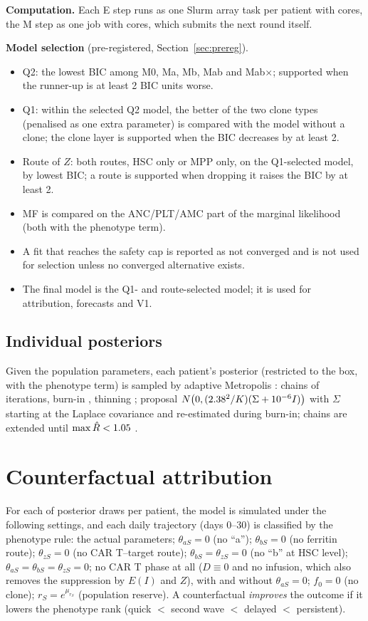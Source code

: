 \documentclass[11pt]{article}
\begin{document}
\textbf{Computation.} Each E step runs as one Slurm array task per patient with \valEcores{} cores, the M step as one job with \valMcores{} cores, which submits the next round itself.



\textbf{Model selection} (pre-registered, Section~\ref{sec:prereg}).
\begin{itemize}
\item Q2: the lowest BIC among M0, Ma, Mb, Mab and Mab$\times$; supported when the runner-up is at least 2 BIC units worse.
\item Q1: within the selected Q2 model, the better of the two clone types (penalised as one extra parameter) is compared with the model without a clone; the clone layer is supported when the BIC decreases by at least 2.
\item Route of $Z$: both routes, HSC only or MPP only, on the Q1-selected model, by lowest BIC; a route is supported when dropping it raises the BIC by at least 2.
\item MF is compared on the ANC/PLT/AMC part of the marginal likelihood (both with the phenotype term).
\item A fit that reaches the safety cap is reported as not converged and is not used for selection unless no converged alternative exists.
\item The final model is the Q1- and route-selected model; it is used for attribution, forecasts and V1.
\end{itemize}

\subsection{Individual posteriors}
Given the population parameters, each patient's posterior (restricted to the box, with the phenotype term) is sampled by adaptive Metropolis \citep{haario2001}: \valChains{} chains of \valIter{} iterations, burn-in \valBurn, thinning \valThin; proposal $N\bigl(0,(2.38^2/K)(\Sigma+10^{-6}I)\bigr)$ with $\Sigma$ starting at the Laplace covariance and re-estimated during burn-in; chains are extended until $\max\hat R<1.05$ \citep{gelman1992}.

\section{Counterfactual attribution}
For each of \valAttrib{} posterior draws per patient, the model is simulated under the following settings, and each daily trajectory (days 0--30) is classified by the phenotype rule: the actual parameters; $\theta_{aS}=0$ (no ``a''); $\theta_{bS}=0$ (no ferritin route); $\theta_{zS}=0$ (no CAR T--target route); $\theta_{bS}=\theta_{zS}=0$ (no ``b'' at HSC level); $\theta_{aS}=\theta_{bS}=\theta_{zS}=0$; no CAR T phase at all ($D\equiv0$ and no infusion, which also removes the suppression by $E(I)$ and $Z$), with and without $\theta_{aS}=0$; $f_0=0$ (no clone); $r_S=e^{\mu_{r_S}}$ (population reserve). A counterfactual \emph{improves} the outcome if it lowers the phenotype rank (quick $<$ second wave $<$ delayed $<$ persistent).
\end{document}
